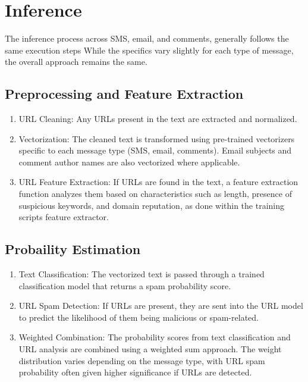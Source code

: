 \documentclass{article}
\begin{document}
\section{Inference}

The inference process across SMS, email, and comments, generally follows the same execution steps While the specifics vary slightly for each type of message, the overall approach remains the same.


\subsection{Preprocessing and Feature Extraction}

\begin{enumerate}
    \item URL Cleaning: Any URLs present in the text are extracted and normalized.
    \item Vectorization: The cleaned text is transformed using pre-trained vectorizers specific to each message type (SMS, email, comments). Email subjects and comment author names are also vectorized where applicable.
    \item URL Feature Extraction: If URLs are found in the text, a feature extraction function analyzes them based on characteristics such as length, presence of suspicious keywords, and domain reputation, as done within the training scripts feature extractor.
\end{enumerate}

\subsection{Probaility Estimation}

\begin{enumerate}
    \item Text Classification: The vectorized text is passed through a trained classification model that returns a spam probability score.
    \item URL Spam Detection: If URLs are present, they are sent into the URL model to predict the likelihood of them being malicious or spam-related.
    \item Weighted Combination: The probability scores from text classification and URL analysis are combined using a weighted sum approach. The weight distribution varies depending on the message type, with URL spam probability often given higher significance if URLs are detected.
\end{enumerate}
\end{document}
